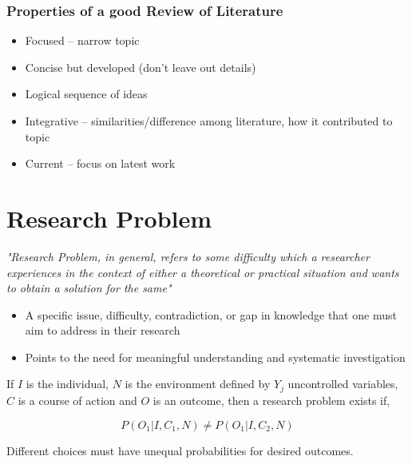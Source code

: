 \documentclass{article}
\begin{document}
\subsubsection{Properties of a good Review of Literature}

\begin{itemize}
    \item Focused -- narrow topic
    \item Concise but developed (don't leave out details)
    \item Logical sequence of ideas
    \item Integrative -- similarities/difference among literature, how it contributed to topic
    \item Current -- focus on latest work
    
\end{itemize}

\section{Research Problem}

\textit{"Research Problem, in general, refers to some difficulty which a researcher experiences in the context of either a theoretical or practical situation and wants to obtain a solution for the same"}

\begin{itemize}
    \item A specific issue, difficulty, contradiction, or gap in knowledge that one must aim to address in their research
    \item Points to the need for meaningful understanding and systematic investigation
\end{itemize}

If $ I $ is the individual, $ N $ is the environment defined by $ Y_j $ uncontrolled variables, $ C $ is a course of action and $ O $ is an outcome, then a research problem exists if,

\begin{equation}
    P (O_1 | I, C_1, N) \neq P(O_1 | I, C_2, N)
\end{equation}

Different choices must have unequal probabilities for desired outcomes.
\end{document}

